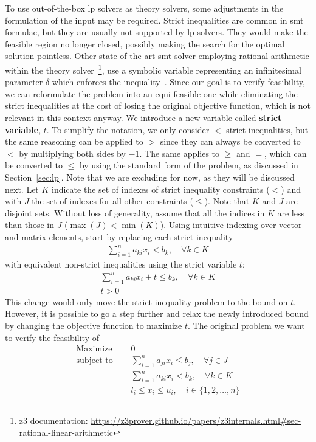 \documentclass[runningheads]{llncs}
\begin{document}
To use out-of-the-box \gls{lp} solvers as theory solvers, some adjustments in the formulation of the input may be required.
Strict inequalities are common in \gls{smt} formulae, but they are usually not supported by \gls{lp} solvers.
They would make the feasible region no longer closed, possibly making the search for the optimal solution pointless.
Other state-of-the-art \gls{smt} solver employing rational arithmetic within the theory solver~\footnote{z3 documentation: \url{https://z3prover.github.io/papers/z3internals.html\#sec-rational-linear-arithmetic}}, use a symbolic variable representing an infinitesimal parameter $\delta$ which enforces the inequality~\cite{ref:lra-dpll-t}.
Since our goal is to verify feasibility, we can reformulate the problem into an equi-feasible one while eliminating the strict inequalities at the cost of losing the original objective function, which is not relevant in this context anyway.
We introduce a new variable called \textbf{strict variable}, $t$.
To simplify the notation, we only consider $<$ strict inequalities, but the same reasoning can be applied to $>$ since they can always be converted to $<$ by multiplying both sides by $-1$.
The same applies to $\ge$ and $=$, which can be converted to $\le$ by using the standard form of the problem, as discussed in Section~\ref{sec:lp}.
Note that we are excluding \nqcs for now, as they will be discussed next.
Let $K$ indicate the set of indexes of strict inequality constraints ($<$) and with $J$ the set of indexes for all other constraints ($\le$).
Note that $K$ and $J$ are disjoint sets.
Without loss of generality, assume that all the indices in $K$ are less than those in $J$ ($\max(J) < \min(K)$).
Using intuitive indexing over vector and matrix elements, start by replacing each strict inequality
\begin{align*}
    \sum_{i=1}^{n} a_{ki}x_{i} < b_k, \quad \forall k \in K
\end{align*}
with equivalent non-strict inequalities using the strict variable $t$:
\begin{align*}
    \sum_{i=1}^{n} a_{ki}x_{i} + t \le b_k, \quad \forall k \in K \\
    t > 0
\end{align*}
This change would only move the strict inequality problem to the bound on $t$.
However, it is possible to go a step further and relax the newly introduced bound by changing the objective function to maximize $t$.
The original problem we want to verify the feasibility of
\begin{equation}
    \label{eq:lp-original}
    \begin{split}
        \text{Maximize }   \quad & 0                                                          \\
        \text{subject to } \quad & \sum_{i=1}^{n} a_{ji}x_{i} \le b_j,  \quad \forall j \in J \\
        \quad                    & \sum_{i=1}^{n} a_{ki}x_{i} < b_k,   \quad \forall k \in K  \\
        & l_i \le x_i \le u_i,  \quad i \in \{1, 2, \ldots, n\}
    \end{split}
\end{equation}
\end{document}

